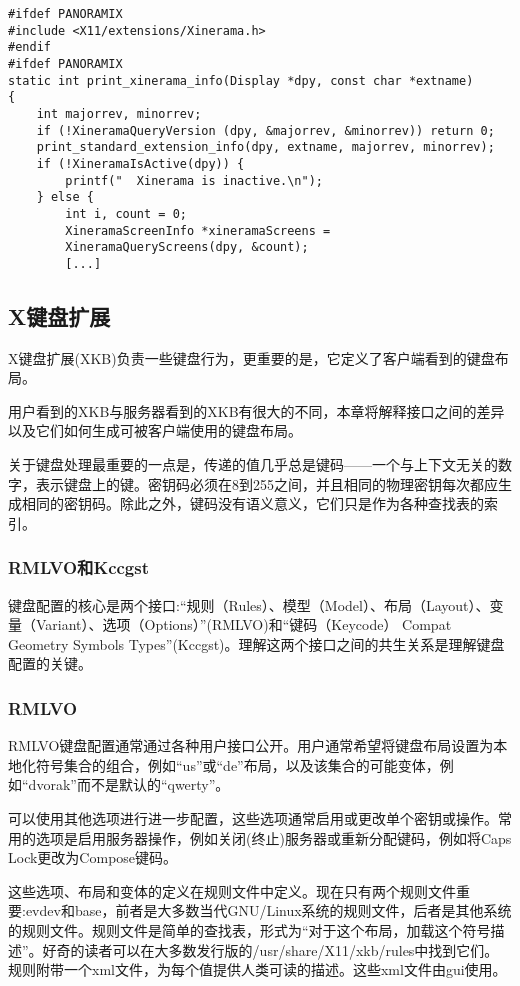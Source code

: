 \begin{lstlisting}
#ifdef PANORAMIX
#include <X11/extensions/Xinerama.h>
#endif
#ifdef PANORAMIX
static int print_xinerama_info(Display *dpy, const char *extname)
{
	int majorrev, minorrev;
	if (!XineramaQueryVersion (dpy, &majorrev, &minorrev)) return 0;
	print_standard_extension_info(dpy, extname, majorrev, minorrev);
	if (!XineramaIsActive(dpy)) {
		printf("  Xinerama is inactive.\n");
	} else {
		int i, count = 0;
		XineramaScreenInfo *xineramaScreens = 
		XineramaQueryScreens(dpy, &count);
		[...]
\end{lstlisting}
\vspace{-4em}

\subsection{X键盘扩展}

X键盘扩展(XKB)负责一些键盘行为，更重要的是，它定义了客户端看到的键盘布局。

用户看到的XKB与服务器看到的XKB有很大的不同，本章将解释接口之间的差异以及它们如何生成可被客户端使用的键盘布局。

关于键盘处理最重要的一点是，传递的值几乎总是键码——一个与上下文无关的数字，表示键盘上的键。密钥码必须在8到255之间，并且相同的物理密钥每次都应生成相同的密钥码。除此之外，键码没有语义意义，它们只是作为各种查找表的索引。

\subsubsection{RMLVO和Kccgst}

键盘配置的核心是两个接口:“规则（Rules）、模型（Model）、布局（Layout）、变量（Variant）、选项（Options）”(RMLVO)和“键码（Keycode） Compat Geometry Symbols Types”(Kccgst)。理解这两个接口之间的共生关系是理解键盘配置的关键。

\subsubsection{RMLVO}

RMLVO键盘配置通常通过各种用户接口公开。用户通常希望将键盘布局设置为本地化符号集合的组合，例如“us”或“de”布局，以及该集合的可能变体，例如“dvorak”而不是默认的“qwerty”。

可以使用其他选项进行进一步配置，这些选项通常启用或更改单个密钥或操作。常用的选项是启用服务器操作，例如关闭(终止)服务器或重新分配键码，例如将Caps Lock更改为Compose键码。

这些选项、布局和变体的定义在规则文件中定义。现在只有两个规则文件重要:evdev和base，前者是大多数当代GNU/Linux系统的规则文件，后者是其他系统的规则文件。规则文件是简单的查找表，形式为“对于这个布局，加载这个符号描述”。好奇的读者可以在大多数发行版的/usr/share/X11/xkb/rules中找到它们。规则附带一个xml文件，为每个值提供人类可读的描述。这些xml文件由gui使用。

